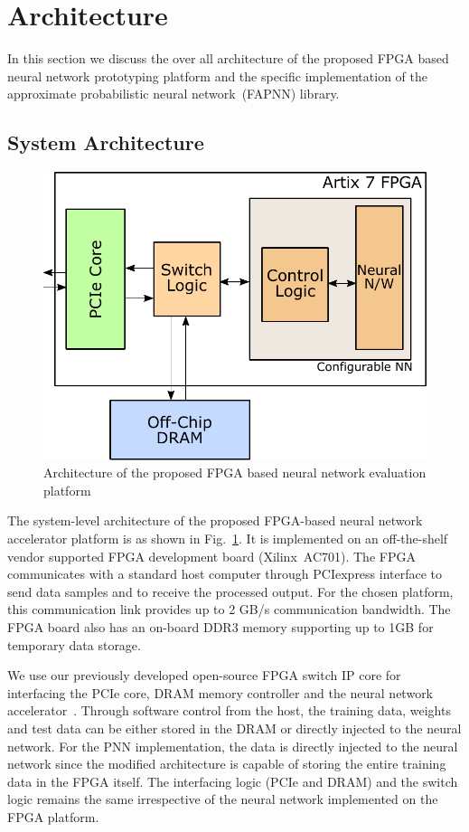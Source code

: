 \section{Architecture}
\label{sec_arch}

In this section we discuss the over all architecture of the proposed FPGA based neural network prototyping platform and the specific implementation of the approximate probabilistic neural network~(FAPNN) library.

\subsection{System Architecture}

\begin{figure}[t]
\centering
   \includegraphics[height=0.7\columnwidth]{Figures/systemarch.pdf}
   \caption{Architecture of the proposed FPGA based neural network evaluation platform}
   \label{fig:sysArch}
\end{figure}

The system-level architecture of the proposed FPGA-based neural network accelerator platform is as shown in Fig.~\ref{fig:sysArch}.
It is implemented on an off-the-shelf vendor supported FPGA development board (Xilinx~AC701).
The FPGA communicates with a standard host computer through PCIexpress interface to send data samples and to receive the processed output.
For the chosen platform, this communication link provides up to 2 GB/s communication bandwidth.
The FPGA board also has an on-board DDR3 memory supporting up to 1GB for temporary data storage.

We use our previously developed open-source FPGA switch IP core for interfacing the PCIe core, DRAM memory controller and the neural network accelerator~\cite{blanked}.
Through software control from the host, the training data, weights and test data can be either stored in the DRAM or directly injected to the neural network.
For the PNN implementation, the data is directly injected to the neural network since the modified architecture is capable of storing the entire training data in the FPGA itself.
The interfacing logic (PCIe and DRAM) and the switch logic remains the same irrespective of the neural network implemented on the FPGA platform.

